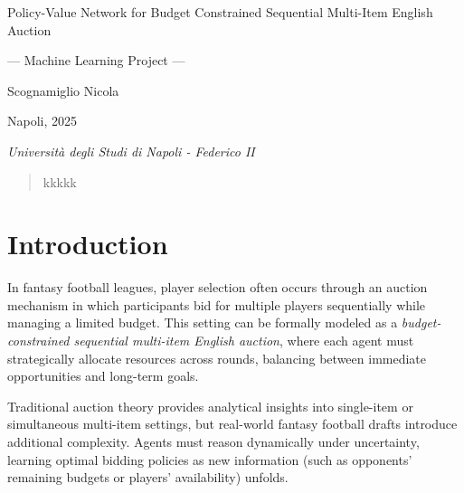\documentclass[12pt]{article}
\begin{document}
\begin{titlepage}
        \centering %
        \vspace*{\baselineskip} %
        
        {\huge Policy-Value Network for Budget Constrained Sequential Multi-Item English Auction}\\[0.2\baselineskip] %
        
        
        \vspace*{\baselineskip}
        
        {\Large --- Machine Learning Project ---\\}

        \vspace*{\baselineskip}
        
        {\LARGE Scognamiglio Nicola\\[\baselineskip]} %
        
        \vspace*{\baselineskip}

        \vfill
        
        Napoli, 2025 \par %
        
        \vspace*{\baselineskip}

        {\itshape Università degli Studi di Napoli - Federico II\par} %
    \end{titlepage}


\tableofcontents
\clearpage


\begin{abstract}
kkkkk
\end{abstract}
\clearpage


\section{Introduction}

In fantasy football leagues, player selection often occurs through an auction mechanism in which participants bid for multiple players sequentially while managing a limited budget. 
This setting can be formally modeled as a \textit{budget-constrained sequential multi-item English auction}, where each agent must strategically allocate resources across rounds, balancing between immediate opportunities and long-term goals.

Traditional auction theory provides analytical insights into single-item or simultaneous multi-item settings, but real-world fantasy football drafts introduce additional complexity. 
Agents must reason dynamically under uncertainty, learning optimal bidding policies as new information (such as opponents’ remaining budgets or players’ availability) unfolds.
\end{document}
